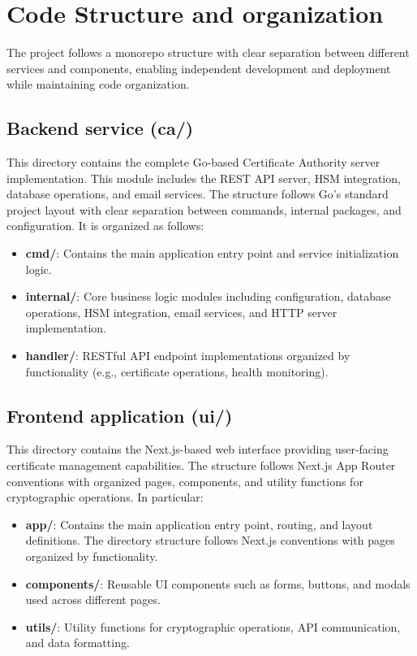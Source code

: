 \section{Code Structure and organization}

The project follows a monorepo structure with clear separation between different 
services and components, enabling independent development and deployment while 
maintaining code organization.

\subsection{Backend service (ca/)}
This directory contains the complete Go-based Certificate Authority 
server implementation. This module includes the REST API server, HSM integration, 
database operations, and email services. The structure follows Go's standard 
project layout with clear separation between commands, internal packages, and 
configuration. It is organized as follows:
\begin{itemize}
    \item \textbf{cmd/}: Contains the main application entry point and service 
    initialization logic.
    \item \textbf{internal/}: Core business logic modules including configuration, 
    database operations, HSM integration, email services, and HTTP server implementation.
    \item \textbf{handler/}: RESTful API endpoint implementations organized by 
    functionality (e.g., certificate operations, health monitoring).
\end{itemize}

\subsection{Frontend application (ui/)}
This directory contains the Next.js-based web interface 
providing user-facing certificate management capabilities. The structure follows 
Next.js App Router conventions with organized pages, components, and utility 
functions for cryptographic operations.
In particular:
\begin{itemize}
    \item \textbf{app/}: Contains the main application entry point, routing, and 
    layout definitions. The directory structure follows Next.js conventions with 
    pages organized by functionality.
    \item \textbf{components/}: Reusable UI components such as forms, buttons, 
    and modals used across different pages.
    \item \textbf{utils/}: Utility functions for cryptographic operations, API 
    communication, and data formatting.
\end{itemize}

